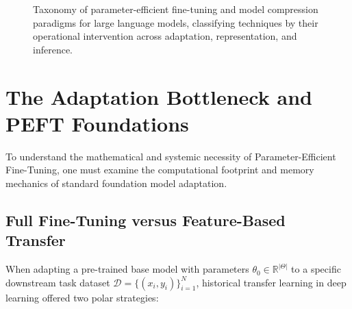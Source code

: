 \documentclass[../../../main.tex]{subfiles}
\begin{document}
\begin{figure}[htbp]
\caption{Taxonomy of parameter-efficient fine-tuning and model compression paradigms for large language models, classifying techniques by their operational intervention across adaptation, representation, and inference.}
\label{fig:peft_efficiency_taxonomy}
\end{figure}

\section{The Adaptation Bottleneck and PEFT Foundations}
\label{sec:adaptation_bottleneck_peft}

To understand the mathematical and systemic necessity of Parameter-Efficient Fine-Tuning, one must examine the computational footprint and memory mechanics of standard foundation model adaptation.

\subsection{Full Fine-Tuning versus Feature-Based Transfer}
\label{subsec:full_ft_vs_feature_based}

When adapting a pre-trained base model with parameters $\theta_0 \in \mathbb{R}^{|\Theta|}$ to a specific downstream task dataset $\mathcal{D} = \{(x_i, y_i)\}_{i=1}^N$, historical transfer learning in deep learning offered two polar strategies:
\end{document}
